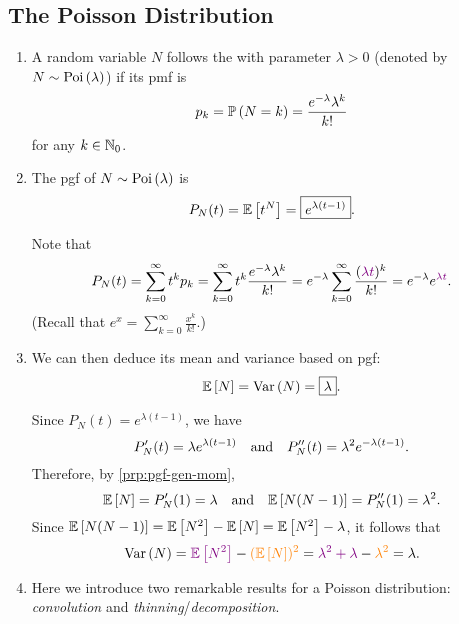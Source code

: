 \subsection{The Poisson Distribution}
\begin{enumerate}
\item A random variable \(N\) follows the  with
parameter \(\lambda>0\) (denoted by \(N\sim\operatorname{Poi}\left(\lambda\right)\)) if its pmf is
\[
p_k=\mathbb{P}\left(N=k\right)=\frac{e^{-\lambda}\lambda^k}{k!}
\]
for any \(k\in\mathbb{N}_0\).
\item \label{it:pois-pgf}
The pgf of \(N\sim\operatorname{Poi}\left(\lambda\right)\) is
\[
P_N(t)=\mathbb{E}\left[t^N\right]=\boxed{e^{\lambda(t-1)}}.
\]
\begin{pf}
Note that
\[
P_N(t)=\sum_{k=0}^{\infty}t^kp_k
=\sum_{k=0}^{\infty}t^k\frac{e^{-\lambda}\lambda^k}{k!}
=e^{-\lambda}\sum_{k=0}^{\infty}\frac{({\color{violet}\lambda t})^k}{k!}
=e^{-\lambda}e^{\color{violet}\lambda t}.
\]
(Recall that \(\displaystyle e^x=\sum_{k=0}^{\infty}\frac{x^k}{k!}\).)
\end{pf}
\item \label{it:pois-mean-var}
We can then deduce its mean and variance based on pgf:
\[
\mathbb{E}\left[N\right]=\operatorname{Var}\left(N\right)=\boxed{\lambda}.
\]
\begin{pf}
Since \(P_N(t)=e^{\lambda(t-1)}\), we have
\[
P_N'(t)=\lambda e^{\lambda(t-1)}\qqtext{and}
P_N''(t)=\lambda^2 e^{-\lambda(t-1)}.
\]
Therefore, by \cref{prp:pgf-gen-mom},
\[
\expv{N}=P_N'(1)=\lambda\qqtext{and}\expv{N(N-1)}=P_N''(1)=\lambda^2.
\]
Since \(\mathbb{E}\left[N(N-1)\right]=\mathbb{E}\left[N^2\right]-\mathbb{E}\left[N\right]=\mathbb{E}\left[N^2\right]-\lambda\), it follows that
\[
\operatorname{Var}\left(N\right)={\color{violet}\mathbb{E}\left[N^2\right]}-{\color{orange}(\mathbb{E}\left[N\right])^{2}}
={\color{violet}\lambda^2+\lambda}-{\color{orange}\lambda^2}
=\lambda.
\]
\end{pf}

\item Here we introduce two remarkable results for a Poisson distribution:
\emph{convolution} and \emph{thinning}/\emph{decomposition}.


\end{enumerate}
